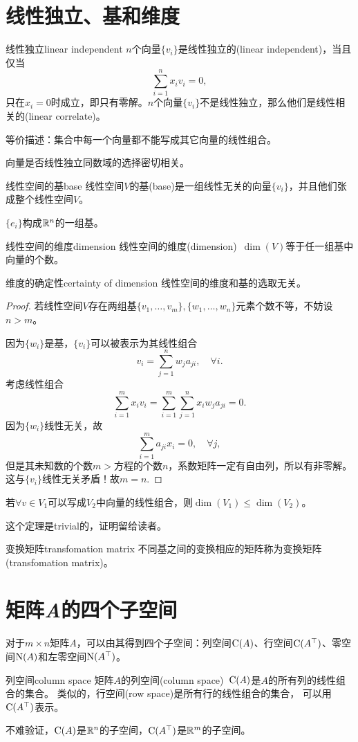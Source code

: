 \section{线性独立、基和维度}
\begin{definition}{线性独立}{linear independent}
	$n$个向量$\{v_i\}$是线性独立的(linear independent)，当且仅当
	\[
		\sum_{i=1}^nx_iv_i=0,
	\]
	只在$x_i=0$时成立，即只有零解。$n$个向量$\{v_i\}$不是线性独立，那么他们是线性相关的(linear correlate)。
	
	等价描述：集合中每一个向量都不能写成其它向量的线性组合。
\end{definition}
向量是否线性独立同数域的选择密切相关。
\begin{definition}{线性空间的基}{base}
	线性空间$V$的基(base)是一组线性无关的向量$\{v_i\}$，并且他们张成整个线性空间$V$。
\end{definition}
$\{e_i\}$构成$\mathbb R^n$的一组基。
\begin{definition}{线性空间的维度}{dimension}
	线性空间的维度(dimension)~$\dim(V)$等于任一组基中向量的个数。
\end{definition}
\begin{theorem}{维度的确定性}{certainty of dimension}
	线性空间的维度和基的选取无关。
\end{theorem}
\begin{proof}
	若线性空间$V$存在两组基$\{v_1,\ldots,v_m\},\{w_1,\ldots,w_n\}$元素个数不等，不妨设$n>m$。
	
	因为$\{w_i\}$是基，$\{v_i\}$可以被表示为其线性组合
	\[
		v_i=\sum_{j=1}^nw_ja_{ji},\quad\forall i.
	\]
	考虑线性组合
	\[
		\sum_{i=1}^mx_iv_i=\sum_{i=1}^m\sum_{j=1}^nx_iw_ja_{ji}=0.
	\]
	因为$\{w_i\}$线性无关，故
	\[
		\sum_{i=1}^ma_{ji}x_i=0,\quad\forall j,
	\]
	但是其未知数的个数$m>$方程的个数$n$，系数矩阵一定有自由列，所以有非零解。这与$\{v_i\}$线性无关矛盾！故$m=n.$
\end{proof}

\begin{theorem}{}{}
	若$\forall v\in V_1$可以写成$V_2$中向量的线性组合，则$\dim(V_1)\leqslant\dim(V_2)$。
\end{theorem}
这个定理是trivial的，证明留给读者。

\begin{definition}{变换矩阵}{transfomation matrix}
	不同基之间的变换相应的矩阵称为变换矩阵(transfomation matrix)。
\end{definition}

\section{矩阵\textit{A}的四个子空间}
对于$m\times n$矩阵$A$，可以由其得到四个子空间：列空间$\operatorname{C}(A)$、行空间$\operatorname{C}(A^\top)$、零空间$\operatorname{N}(A)$和左零空间$\operatorname{N}(A^\top)$。
\begin{definition}{列空间}{column space}
	矩阵$A$的列空间(column space)~$\operatorname{C}(A)$是$A$的所有列的线性组合的集合。
	\tcblower
	类似的，行空间(row space)是所有行的线性组合的集合，%
	可以用$\operatorname{C}(A^\top)$表示。
\end{definition}
不难验证，$\operatorname{C}(A)$是$\mathbb R^n$的子空间，$\operatorname{C}(A^\top)$是$\mathbb R^m$的子空间。

